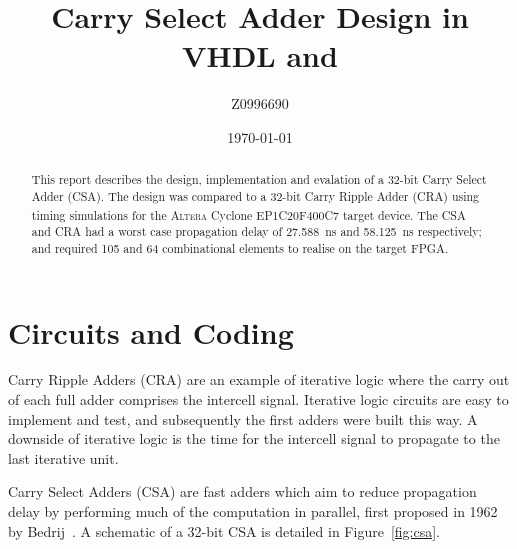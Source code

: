 \documentclass[a4paper,11pt]{article}
\title{Carry Select Adder Design in VHDL and \Altera \QuartusII}
\author{Z0996690}
\date{\today}
\newcommand{\Altera}{\textsc{Altera}\textsuperscript{\textregistered}\xspace}
\begin{document}
\begin{@twocolumnfalse} \centering
    \renewcommand{\abstractname}{\large Abstract}
    \begin{abstract}
        This report describes the design, implementation and evalation of a 32-bit Carry Select Adder (CSA). The design was compared to a 32-bit Carry Ripple Adder (CRA) using timing simulations for the \Altera Cyclone EP1C20F400C7 target device. The CSA and CRA had a worst case propagation delay of \SI{27.588}{\ns} and \SI{58.125}{\ns} respectively; and required 105 and 64 combinational elements to realise on the target FPGA.
    \end{abstract}
\end{@twocolumnfalse}

\section{Circuits and Coding}

Carry Ripple Adders (CRA) are an example of iterative logic where the carry out of each full adder comprises the intercell signal. Iterative logic circuits are easy to implement and test, and subsequently the first adders were built this way. A downside of iterative logic is the time for the intercell signal to propagate to the last iterative unit.

Carry Select Adders (CSA) are fast adders which aim to reduce propagation delay by performing much of the computation in parallel, first proposed in 1962 by Bedrij~\cite{bedrij1962carry}. A schematic of a 32-bit CSA is detailed in Figure~\ref{fig:csa}.
\end{document}
